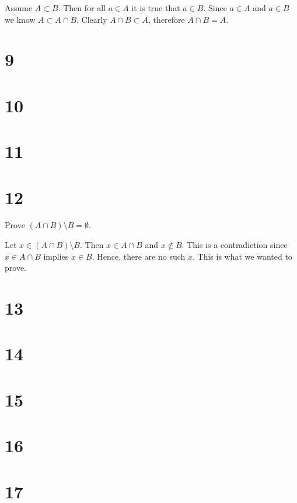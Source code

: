 \documentclass[a4paper]{article}
\begin{document}
Assume $A \subset B$. Then for all $a \in A$ it is true that $a \in B$. Since $a \in A$ and $a \in B$ we know $A \subset A \cap B$. Clearly $A \cap B \subset A$, therefore $A \cap B = A$.

\section*{9}


\section*{10}


\section*{11}


\section*{12}

Prove $(A \cap B) \setminus B = \emptyset$.

\vspace{\baselineskip}

Let $ x \in (A \cap B) \setminus B$. Then $x \in A \cap B$ and $x \not\in B$. This is a contradiction since $x \in A \cap B$ implies $x \in B$. Hence, there are no such $x$. This is what we wanted to prove.


\section*{13}


\section*{14}


\section*{15}


\section*{16}


\section*{17}
\end{document}
